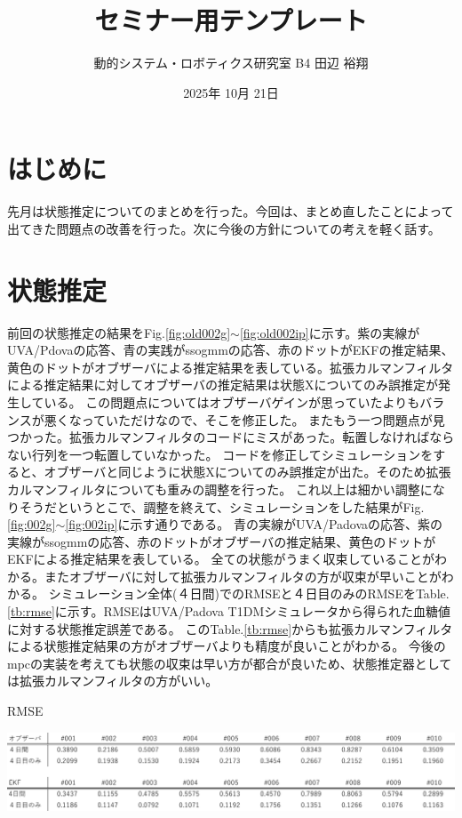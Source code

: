 \documentclass[platex]{jsarticle}
\title{セミナー用テンプレート}
\author{動的システム・ロボティクス研究室 \quad B4 \quad 田辺 裕翔}
\date{2025年 10月 21日}
\begin{document}
\maketitle
\section{はじめに}
先月は状態推定についてのまとめを行った。今回は、まとめ直したことによって出てきた問題点の改善を行った。次に今後の方針についての考えを軽く話す。

\section{状態推定}
前回の状態推定の結果をFig.\ref{fig:old002g}$\sim$\ref{fig:old002ip}に示す。紫の実線がUVA/Pdovaの応答、青の実践がssogmmの応答、赤のドットがEKFの推定結果、黄色のドットがオブザーバによる推定結果を表している。拡張カルマンフィルタによる推定結果に対してオブザーバの推定結果は状態Xについてのみ誤推定が発生している。
この問題点についてはオブザーバゲインが思っていたよりもバランスが悪くなっていただけなので、そこを修正した。
またもう一つ問題点が見つかった。拡張カルマンフィルタのコードにミスがあった。転置しなければならない行列を一つ転置していなかった。
コードを修正してシミュレーションをすると、オブザーバと同じように状態Xについてのみ誤推定が出た。そのため拡張カルマンフィルタについても重みの調整を行った。
これ以上は細かい調整になりそうだというとこで、調整を終えて、シミュレーションをした結果がFig.\ref{fig:002g}$\sim$\ref{fig:002ip}に示す通りである。
青の実線がUVA/Padovaの応答、紫の実線がssogmmの応答、赤のドットがオブザーバの推定結果、黄色のドットがEKFによる推定結果を表している。
全ての状態がうまく収束していることがわかる。またオブザーバに対して拡張カルマンフィルタの方が収束が早いことがわかる。
シミュレーション全体(４日間)でのRMSEと４日目のみのRMSEをTable.\ref{tb:rmse}に示す。RMSEはUVA/Padova T1DMシミュレータから得られた血糖値に対する状態推定誤差である。
このTable.\ref{tb:rmse}からも拡張カルマンフィルタによる状態推定結果の方がオブザーバよりも精度が良いことがわかる。
今後のmpcの実装を考えても状態の収束は早い方が都合が良いため、状態推定器としては拡張カルマンフィルタの方がいい。
\begin{table}[htbp]
  \centering
    \caption{RMSE}
   \includegraphics[width=\columnwidth]{fig/rmse.pdf}
  \label{tb:rmse}
\end{table}
\end{document}
